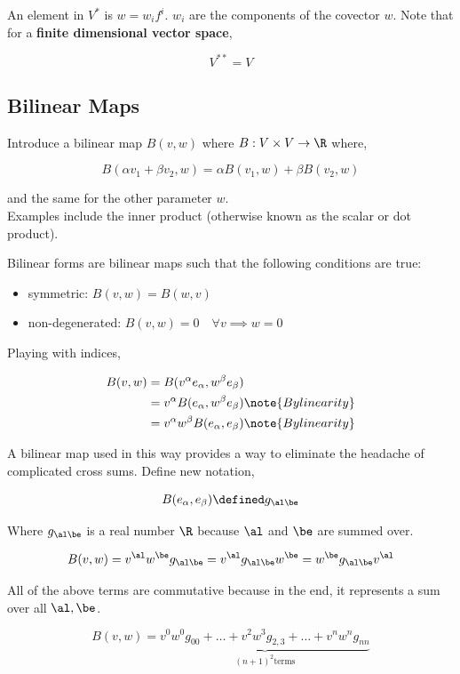 \documentclass{article}
\begin{document}
An element in $V^*$ is $w = w_if^i$. $w_i$ are the components of the covector $w$. Note that for a \textbf{finite dimensional vector space},

\[ V^{**} = V \]

\subsection{Bilinear Maps}

Introduce a bilinear map $B(v, w)$ where $B: V \times V \to \R$ where,

\[ B(\alpha v_1 + \beta v_2, w) = \alpha B(v_1, w) + \beta B(v_2, w) \]

and the same for the other parameter $w$. \\

Examples include the inner product (otherwise known as the scalar or dot product).

Bilinear forms are bilinear maps such that the following conditions are true:

\begin{itemize}
    \item symmetric: $B(v,w) = B(w,v)$
    \item non-degenerated: $B(v,w) = 0 \quad \forall v \implies w = 0$
\end{itemize}

Playing with indices,

\begin{align*}
    B(v,w) &= B(v^\alpha e_\alpha, w^\beta e_\beta) \\
           &= v^\alpha B( e_\alpha, w^\beta e_\beta) \note{By linearity} \\
           &= v^\alpha w^\beta B( e_\alpha, e_\beta) \note{By linearity}
\end{align*}

A bilinear map used in this way provides a way to eliminate the headache of complicated cross sums. Define new notation,

\[ B( e_\alpha, e_\beta) \defined g_{\al\be} \]

Where $g_{\al\be}$ is a real number $\R$ because $\al$ and $\be$ are summed over.

\[ B(v, w) = v^\al w^\be g_{\al\be} = v^\al g_{\al\be}w^\be =  w^\be g_{\al\be} v^\al \]

All of the above terms are commutative because in the end, it represents a sum over all $\al, \be$.

\[ B(v,w) = \underbrace{v^0w^0g_{00} + \ldots + v^2w^3g_{2,3} + \ldots + v^nw^ng_{nn}}_{(n+1)^2 \text{terms}} \]
\end{document}

